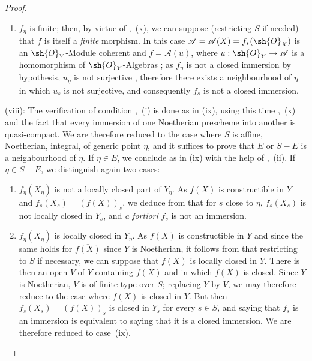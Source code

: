 \begin{proof}
\begin{enumerate}[label=\upshape{$\arabic{enumi}^\circ$}]
  \item $f_\eta$ is finite; then, by virtue of ,~(x), we can suppose (restricting $S$ if needed) that $f$ is itself a \emph{finite} morphism.
  In this case $\mathscr{A}=\mathscr{A}(X)=f_*(\sh{O}_X)$ is an $\sh{O}_Y$-Module coherent  and $f=\mathscr{A}(u)$, where $u:\sh{O}_Y\to\mathscr{A}$ is a homomorphism of $\sh{O}_Y$-Algebras ; as $f_\eta$ is not a closed immersion by hypothesis, $u_\eta$ is not surjective , therefore  there exists a neighbourhood of $\eta$ in which $u_s$ is not surjective, and consequently  $f_s$ is not a closed immersion.
\end{enumerate}

(viii): The verification of condition ,~(i) is done as in (ix), using this time ,~(x) and the fact that every immersion of one Noetherian prescheme into another is quasi-compact.
We are therefore reduced to the case where $S$ is affine, Noetherian, integral, of generic point $\eta$, and it suffices to prove that $E$ or $S-E$ is a neighbourhood of $\eta$.
If $\eta\in E$, we conclude as in (ix) with the help of ,~(ii).
If $\eta\in S-E$, we distinguish again two cases:
\begin{enumerate}[label=\upshape{$\arabic{enumi}^\circ$}]
  \item $f_\eta(X_\eta)$ is not a locally closed part of $Y_\eta$.
  As $f(X)$ is constructible in $Y$  and $f_s(X_s)=(f(X))_s$, we deduce from  that for $s$ close to $\eta$, $f_s(X_s)$ is not locally closed in $Y_s$, and \emph{a fortiori} $f_s$ is not an immersion.

  \item{} $f_\eta(X_\eta)$ is locally closed in $Y_\eta$.
  As $f(X)$ is constructible in $Y$  and since the same holds for $\overline{f(X)}$ since $Y$ is Noetherian, it follows from  that restricting to $S$ if necessary, we can suppose that $f(X)$ is locally closed in $Y$.
  There is then an open $V$ of $Y$ containing $f(X)$ and in which $f(X)$ is closed.
  Since $Y$ is Noetherian, $V$ is of finite type over $S$; replacing $Y$ by $V$, we may therefore reduce to the case where $f(X)$ is closed in $Y$.
  But then $f_s(X_s)=(f(X))_s$ is closed in $Y_s$ for every $s\in S$, and saying that $f_s$ is an immersion is equivalent to saying that it is a closed immersion.
  We are therefore reduced to case~(ix).
\end{enumerate}


\end{proof}
